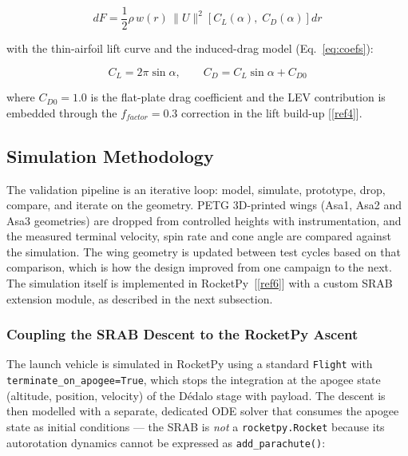 \begin{equation}
dF = \frac{1}{2}\rho\, w(r)\, \|U\|^2 \left[C_L(\alpha),\; C_D(\alpha)\right] dr
\label{eq:bem}
\end{equation}

with the thin-airfoil lift curve and the induced-drag model
(Eq.~\ref{eq:coefs}):

\begin{equation}
C_L = 2\pi\sin\alpha, \qquad
C_D = C_L \sin\alpha + C_{D0}
\label{eq:coefs}
\end{equation}

where $C_{D0} = 1.0$ is the flat-plate drag coefficient and the LEV
contribution is embedded through the $f_{factor} = 0.3$ correction in
the lift build-up [\ref{ref4}].

\subsection{Simulation Methodology}

The validation pipeline is an iterative loop: model, simulate,
prototype, drop, compare, and iterate on the geometry. PETG
3D-printed wings (Asa1, Asa2 and Asa3 geometries) are dropped from
controlled heights with instrumentation, and the measured terminal
velocity, spin rate and cone angle are compared against the
simulation. The wing geometry is updated between test cycles based
on that comparison, which is how the design improved from one
campaign to the next. The simulation itself is implemented in
RocketPy~[\ref{ref6}] with a custom SRAB extension module, as
described in the next subsection.

\subsubsection{Coupling the SRAB Descent to the RocketPy Ascent}

The launch vehicle is simulated in RocketPy using a standard
\texttt{Flight} with \texttt{terminate\_on\_apogee=True}, which
stops the integration at the apogee state (altitude, position,
velocity) of the Dédalo stage with payload. The descent is then
modelled with a separate, dedicated ODE solver that consumes the
apogee state as initial conditions --- the SRAB is \emph{not} a
\texttt{rocketpy.Rocket} because its autorotation dynamics cannot
be expressed as \texttt{add\_parachute()}:

